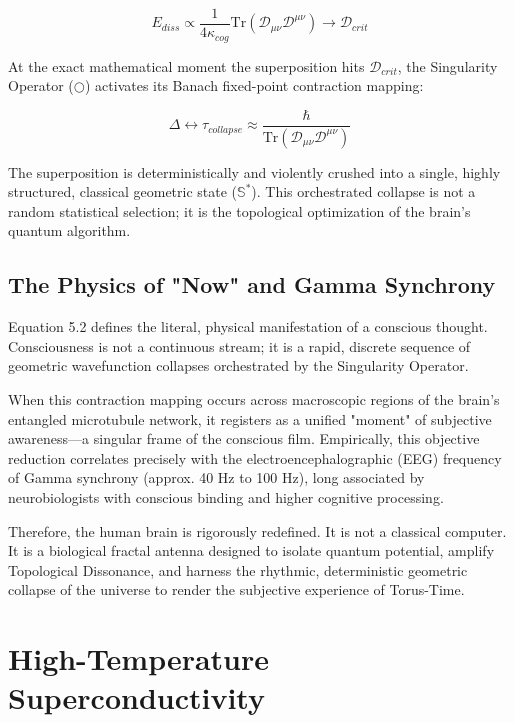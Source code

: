 \documentclass[12pt,openany]{book}
\begin{document}
\begin{equation}
E_{diss} \propto \frac{1}{4\kappa_{cog}} \text{Tr}(\mathcal{D}_{\mu\nu} \mathcal{D}^{\mu\nu}) \to \mathcal{D}_{crit}
\end{equation}

At the exact mathematical moment the superposition hits $\mathcal{D}_{crit}$, the Singularity Operator ($\bigcirc$) activates its Banach fixed-point contraction mapping:

\begin{equation}
\Delta \leftrightarrow\tau_{collapse} \approx \frac{\hbar}{\text{Tr}(\mathcal{D}_{\mu\nu} \mathcal{D}^{\mu\nu})}
\end{equation}

The superposition is deterministically and violently crushed into a single, highly structured, classical geometric state ($\mathbb{S}^*$). This orchestrated collapse is not a random statistical selection; it is the topological optimization of the brain's quantum algorithm.

\section{The Physics of "Now" and Gamma Synchrony}
Equation 5.2 defines the literal, physical manifestation of a conscious thought. Consciousness is not a continuous stream; it is a rapid, discrete sequence of geometric wavefunction collapses orchestrated by the Singularity Operator.

When this contraction mapping occurs across macroscopic regions of the brain's entangled microtubule network, it registers as a unified "moment" of subjective awareness—a singular frame of the conscious film. Empirically, this objective reduction correlates precisely with the electroencephalographic (EEG) frequency of Gamma synchrony (approx. 40 Hz to 100 Hz), long associated by neurobiologists with conscious binding and higher cognitive processing.

Therefore, the human brain is rigorously redefined. It is not a classical computer. It is a biological fractal antenna designed to isolate quantum potential, amplify Topological Dissonance, and harness the rhythmic, deterministic geometric collapse of the universe to render the subjective experience of Torus-Time.

\chapter{High-Temperature Superconductivity}
\end{document}
